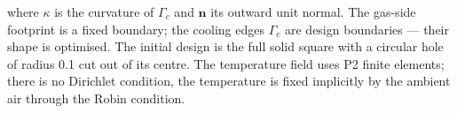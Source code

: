 \documentclass[preview]{standalone}
\begin{document}
where $\kappa$ is the curvature of $\Gamma_c$ and $\mathbf n$ its outward unit normal.  The gas-side footprint is a fixed boundary; the cooling edges $\Gamma_c$ are design boundaries — their shape is optimised.
The initial design is the full solid square with a circular hole of radius 0.1 cut out of its centre.  The temperature field uses P2 finite elements; there is no Dirichlet condition, the temperature is fixed implicitly by the ambient air through the Robin condition.
\end{document}
